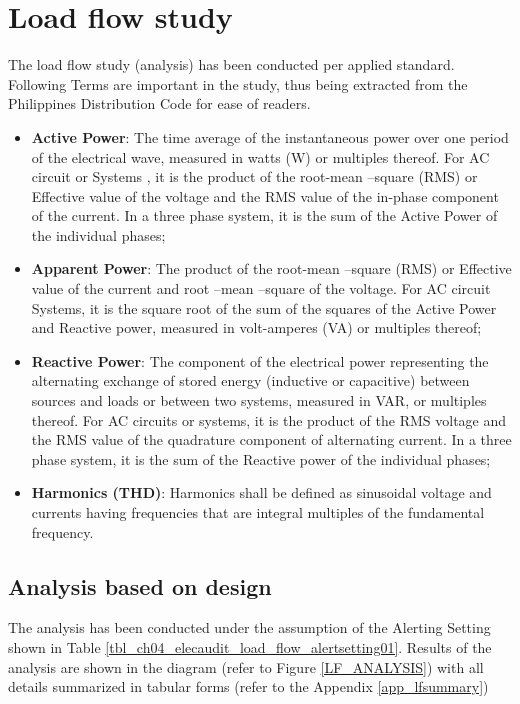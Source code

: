 %
\section{Load flow study} \label{ch04_elecaudit_loadflow}
The load flow study (analysis) has been conducted per applied standard. Following Terms are important in the study, thus being extracted from the Philippines Distribution Code for ease of readers.

\begin{itemize}
\item \textbf{Active Power}: The time average of the instantaneous power over one period of the electrical wave, measured in watts  (W) or multiples thereof. For AC circuit or Systems , it is the product of the root-mean –square (RMS) or Effective value of the voltage and the RMS value of the in-phase component of the current. In a three phase system, it is the sum of the Active Power of the individual phases;

\item \textbf{Apparent Power}: The product of the root-mean –square (RMS) or  Effective value of the current and root 	–mean –square of the voltage. For AC circuit Systems, it is the square root of the sum of the squares of the Active Power and Reactive power, measured in volt-amperes (VA) or multiples thereof;


\item \textbf{Reactive Power}: The component of the electrical power representing the alternating exchange of stored energy  (inductive or capacitive) between sources and loads or between two systems, measured in VAR, or multiples thereof. For AC circuits or systems, it is the product of the RMS voltage and the RMS value of the quadrature component of alternating current. In a three phase system, it is the sum of the Reactive power of the individual phases;


\item \textbf{Harmonics (THD)}: Harmonics shall be defined as sinusoidal voltage and currents having frequencies that are integral multiples of the fundamental frequency.

\end{itemize}

\subsection{Analysis based on design}
The analysis has been conducted under the assumption of the Alerting Setting shown in Table \ref{tbl_ch04_elecaudit_load_flow_alertsetting01}. Results of the analysis are shown in the diagram (refer to Figure \ref{LF_ANALYSIS}) with all details summarized in tabular forms (refer to the Appendix \ref{app_lfsummary})

